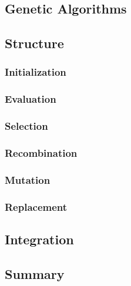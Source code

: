 \documentclass[10pt]{amsart}
\begin{document}
\begin{multicols}{2}
  \section{Genetic Algorithms}%
  \label{sec:genetic_algorithms}

  \subsection{Structure}%
  \label{sub:structure}

  \subsubsection{Initialization}%
  \label{ssub:initialization}

  \subsubsection{Evaluation}%
  \label{ssub:evaluation}

  \subsubsection{Selection}%
  \label{ssub:selection}

  \subsubsection{Recombination}%
  \label{ssub:recombination}

  \subsubsection{Mutation}%
  \label{ssub:mutation}

  \subsubsection{Replacement}%
  \label{ssub:replacement}

  \subsection{Integration}%
  \label{sub:integration}

  \subsection{Summary}%
  \label{sub:summaryb}

\end{multicols}
\end{document}
